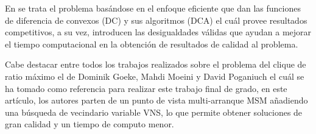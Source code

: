 En \cite{mrcp-moeni} se trata el problema basándose en el enfoque eficiente que dan las funciones de diferencia de convexos (DC) y sus algoritmos (DCA) el cuál provee resultados competitivos, a su vez, introducen las desigualdades válidas que ayudan a mejorar el tiempo computacional en la obtención de resultados de calidad al problema.

Cabe destacar entre todos los trabajos realizados sobre el problema del clique de ratio máximo el de Dominik Goeke, Mahdi Moeini y David Poganiuch \cite{mrcp-GOEKE2017283} el cuál se ha tomado como referencia para realizar este trabajo final de grado, en este artículo, los autores parten de un punto de vista multi-arranque \gls{MSM} añadiendo una búsqueda de vecindario variable \gls{VNS}, lo que permite obtener soluciones de gran calidad y un tiempo de computo menor.


